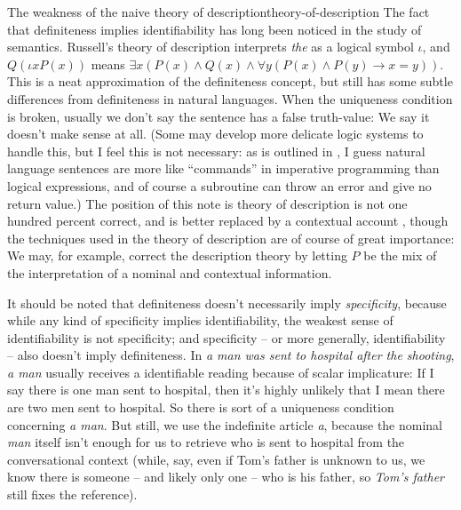 \documentclass[UTF8, a4paper, oneside, scheme=plain]{ctexrep}
\newcommand*{\citepage}[1]{pp.~{#1}}
\newcommand{\corpus}[1]{\emph{#1}}
\begin{document}
\begin{theorybox}{The weakness of the naive theory of description}{theory-of-description}
    The fact that definiteness implies identifiability has long been noticed in the study of semantics.
    Russell's theory of description interprets \corpus{the} 
    as a logical symbol $\iota$,
    and $Q(\iota x P(x))$
    means $\exists x (P(x) \land Q(x) \land \forall y (P(x) \land P(y) \rightarrow  x = y)) $.
    This is a neat approximation of the definiteness concept,
    but still has some subtle differences from definiteness in natural languages.
    When the uniqueness condition is broken, 
    usually we don't say the sentence has a false truth-value:
    We say it doesn't make sense at all.
    (Some may develop more delicate logic systems to handle this,
    but I feel this is not necessary:
    as is outlined in ,
    I guess natural language sentences are more like 
    ``commands'' in imperative programming than logical expressions,
    and of course a subroutine can throw an error and give no return value.)
    The position of this note is 
    theory of description is not one hundred percent correct,
    and is better replaced by a contextual account \citep[\citepage{368}]{cgel},
    though the techniques used in the theory of description
    are of course of great importance:
    We may, for example, correct the description theory 
    by letting $P$ be the mix of the interpretation of a nominal and contextual information.
\end{theorybox}

It should be noted that definiteness doesn't necessarily imply \emph{specificity},
because while any kind of specificity implies identifiability, 
the weakest sense of identifiability 
is not specificity;
and specificity -- or more generally, identifiability -- 
also doesn't imply definiteness.
In \corpus{a man was sent to hospital after the shooting}, 
\corpus{a man} usually receives a identifiable reading 
because of scalar implicature: 
If I say there is one man sent to hospital,
then it's highly unlikely that I mean there are two men sent to hospital.
So there is sort of a uniqueness condition concerning \corpus{a man}.
But still, we use the indefinite article \corpus{a},
because the nominal \corpus{man} itself 
isn't enough for us to retrieve who is sent to hospital from the conversational context
(while, say, even if Tom's father is unknown to us,
we know there is someone -- and likely only one -- who is his father,
so \corpus{Tom's father} still fixes the reference).
\end{document}

